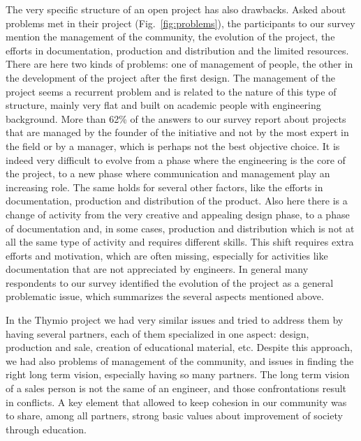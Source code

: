 \documentclass[letterpaper, 10 pt, conference]{ieeeconf}  %
\begin{document}
The very specific structure of an open project has also drawbacks. 
Asked about problems met in their project (Fig.~\ref{fig:problems}), the participants to our survey mention the management of the community, the evolution of the project, the efforts in documentation, production and distribution and the limited resources.
There are here two kinds of problems: one of management of people, the other in the development of the project after the first design.
The management of the project seems a recurrent problem and is related to the nature of this type of structure, mainly very flat and built on academic people with engineering background. 
More than 62\% of the answers to our survey report about projects that are managed by the founder of the initiative and not by the most expert in the field or by a manager, which is perhaps not the best objective choice.
It is indeed very difficult to evolve from a phase where the engineering is the core of the project, to a new phase where communication and management play an increasing role.
The same holds for several other factors, like the efforts in documentation, production and distribution of the product. 
Also here there is a change of activity from the very creative and appealing design phase, to a phase of documentation and, in some cases, production and distribution which is not at all the same type of activity and requires different skills.
This shift requires extra efforts and motivation, which are often missing, especially for activities like documentation that are not appreciated by engineers.
In general many respondents to our survey identified the evolution of the project as a general problematic issue, which summarizes the several aspects mentioned above.

In the Thymio project we had very similar issues and tried to address them by having several partners, each of them specialized in one aspect: design, production and sale, creation of educational material, etc.
Despite this approach, we had also problems of management of the community, and issues in finding the right long term vision, especially having so many partners. 
The long term vision of a sales person is not the same of an engineer, and those confrontations result in conflicts. 
A key element that allowed to keep cohesion in our community was to share, among all partners, strong basic values about improvement of society through education.
\end{document}
